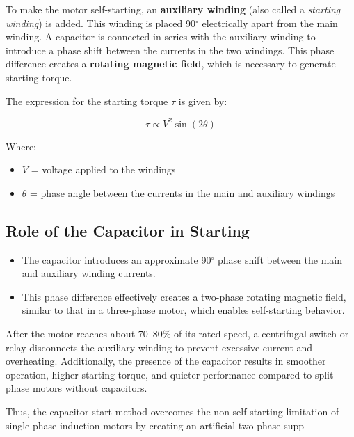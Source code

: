 \documentclass[a4paper,12pt]{article}
\begin{document}
	To make the motor self-starting, an \textbf{auxiliary winding} (also called a \textit{starting winding}) is added. This winding is placed 90$^\circ$ electrically apart from the main winding. A capacitor is connected in series with the auxiliary winding to introduce a phase shift between the currents in the two windings. This phase difference creates a \textbf{rotating magnetic field}, which is necessary to generate starting torque.
	
	The expression for the starting torque \(\tau\) is given by:
	
	$$
	\tau \propto V^2 \sin(2\theta)
	$$
	
	Where:
	\begin{itemize}
		\item \(V\) = voltage applied to the windings
		\item \(\theta\) = phase angle between the currents in the main and auxiliary windings
	\end{itemize}
	
	\subsection*{Role of the Capacitor in Starting}
	
	\begin{itemize}
		\item The capacitor introduces an approximate 90$^\circ$ phase shift between the main and auxiliary winding currents.
		\item This phase difference effectively creates a two-phase rotating magnetic field, similar to that in a three-phase motor, which enables self-starting behavior.
	\end{itemize}
	
	After the motor reaches about 70--80\% of its rated speed, a centrifugal switch or relay disconnects the auxiliary winding to prevent excessive current and overheating. Additionally, the presence of the capacitor results in smoother operation, higher starting torque, and quieter performance compared to split-phase motors without capacitors.
	
	Thus, the capacitor-start method overcomes the non-self-starting limitation of single-phase induction motors by creating an artificial two-phase supp
	
\end{document}
